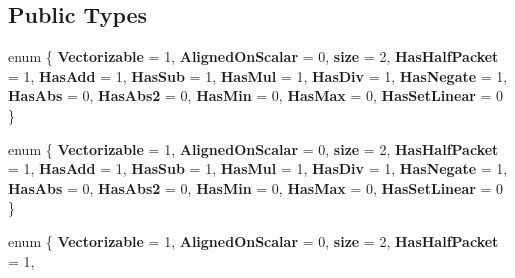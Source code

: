 \subsection*{Public Types}
\begin{DoxyCompactItemize}
\item 
\mbox{\label{struct_eigen_1_1internal_1_1packet__traits_3_01std_1_1complex_3_01double_01_4_01_4_ab449b48cbc0b8dfb6ff2dfcc1bd74836}} 
enum \{ \newline
{\bfseries Vectorizable} = 1, 
{\bfseries Aligned\+On\+Scalar} = 0, 
{\bfseries size} = 2, 
{\bfseries Has\+Half\+Packet} = 1, 
\newline
{\bfseries Has\+Add} = 1, 
{\bfseries Has\+Sub} = 1, 
{\bfseries Has\+Mul} = 1, 
{\bfseries Has\+Div} = 1, 
\newline
{\bfseries Has\+Negate} = 1, 
{\bfseries Has\+Abs} = 0, 
{\bfseries Has\+Abs2} = 0, 
{\bfseries Has\+Min} = 0, 
\newline
{\bfseries Has\+Max} = 0, 
{\bfseries Has\+Set\+Linear} = 0
 \}
\item 
\mbox{\label{struct_eigen_1_1internal_1_1packet__traits_3_01std_1_1complex_3_01double_01_4_01_4_a4f68447c94068ca909b1d79df7efa0fc}} 
enum \{ \newline
{\bfseries Vectorizable} = 1, 
{\bfseries Aligned\+On\+Scalar} = 0, 
{\bfseries size} = 2, 
{\bfseries Has\+Half\+Packet} = 1, 
\newline
{\bfseries Has\+Add} = 1, 
{\bfseries Has\+Sub} = 1, 
{\bfseries Has\+Mul} = 1, 
{\bfseries Has\+Div} = 1, 
\newline
{\bfseries Has\+Negate} = 1, 
{\bfseries Has\+Abs} = 0, 
{\bfseries Has\+Abs2} = 0, 
{\bfseries Has\+Min} = 0, 
\newline
{\bfseries Has\+Max} = 0, 
{\bfseries Has\+Set\+Linear} = 0
 \}
\item 
\mbox{\label{struct_eigen_1_1internal_1_1packet__traits_3_01std_1_1complex_3_01double_01_4_01_4_ae79ecd80d9723f0cc3bb0c56a4cfc61a}} 
enum \{ \newline
{\bfseries Vectorizable} = 1, 
{\bfseries Aligned\+On\+Scalar} = 0, 
{\bfseries size} = 2, 
{\bfseries Has\+Half\+Packet} = 1, 

\end{DoxyCompactItemize}
